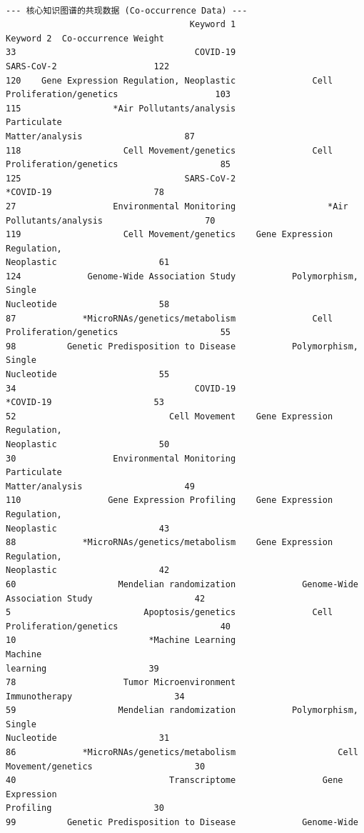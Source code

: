 \documentclass[11pt]{article}
\begin{document}
    \begin{Verbatim}[commandchars=\\\{\}]

--- 核心知识图谱的共现数据 (Co-occurrence Data) ---
                                    Keyword 1
Keyword 2  Co-occurrence Weight
33                                   COVID-19
SARS-CoV-2                   122
120    Gene Expression Regulation, Neoplastic               Cell
Proliferation/genetics                   103
115                  *Air Pollutants/analysis               Particulate
Matter/analysis                    87
118                    Cell Movement/genetics               Cell
Proliferation/genetics                    85
125                                SARS-CoV-2
*COVID-19                    78
27                   Environmental Monitoring                  *Air
Pollutants/analysis                    70
119                    Cell Movement/genetics    Gene Expression Regulation,
Neoplastic                    61
124             Genome-Wide Association Study           Polymorphism, Single
Nucleotide                    58
87             *MicroRNAs/genetics/metabolism               Cell
Proliferation/genetics                    55
98          Genetic Predisposition to Disease           Polymorphism, Single
Nucleotide                    55
34                                   COVID-19
*COVID-19                    53
52                              Cell Movement    Gene Expression Regulation,
Neoplastic                    50
30                   Environmental Monitoring               Particulate
Matter/analysis                    49
110                 Gene Expression Profiling    Gene Expression Regulation,
Neoplastic                    43
88             *MicroRNAs/genetics/metabolism    Gene Expression Regulation,
Neoplastic                    42
60                    Mendelian randomization             Genome-Wide
Association Study                    42
5                          Apoptosis/genetics               Cell
Proliferation/genetics                    40
10                          *Machine Learning                          Machine
learning                    39
78                     Tumor Microenvironment
Immunotherapy                    34
59                    Mendelian randomization           Polymorphism, Single
Nucleotide                    31
86             *MicroRNAs/genetics/metabolism                    Cell
Movement/genetics                    30
40                              Transcriptome                 Gene Expression
Profiling                    30
99          Genetic Predisposition to Disease             Genome-Wide

\end{Verbatim}
\end{document}
